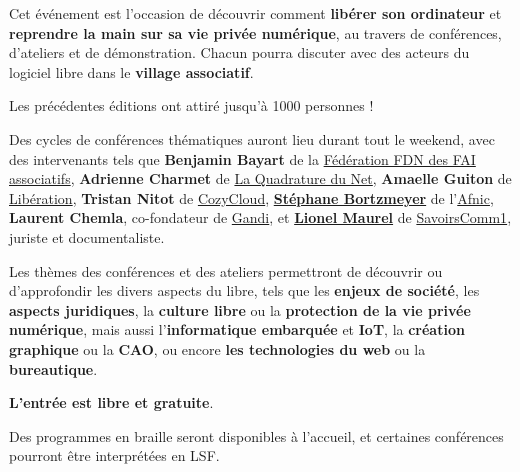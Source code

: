 
\Separateur

Cet événement est l'occasion de découvrir comment \textbf{libérer son ordinateur}
et \textbf{reprendre la main sur sa vie privée numérique},
au travers de conférences, d'ateliers et de démonstration.
Chacun pourra discuter avec des acteurs du logiciel libre dans le \textbf{village associatif}.

Les précédentes éditions ont attiré jusqu'à 1000 personnes !

\Separateur

Des cycles de conférences thématiques auront lieu durant tout le weekend,
avec des intervenants tels que \textbf{Benjamin Bayart} de la \href{http://ffdn.org/}{Fédération FDN des FAI associatifs},
\textbf{Adrienne Charmet} de \href{http://laquadrature.net/}{La Quadrature du Net},
\textbf{Amaelle Guiton} de \href{http://www.liberation.fr/auteur/15260-amaelle-guiton}{Libération},
\textbf{Tristan Nitot} de \href{https://cozy.io/fr/}{CozyCloud},
\textbf{\href{http://www.bortzmeyer.org/}{Stéphane Bortzmeyer}} de l'\href{}{Afnic},
\textbf{Laurent Chemla}, co-fondateur de \href{http://gandi.net/}{Gandi},
et \textbf{\href{http://scinfolex.com/}{Lionel Maurel}} de \href{http://savoirscom1.info/}{SavoirsComm1}, juriste et documentaliste.

\Separateur

Les thèmes des conférences et des ateliers permettront de découvrir ou d'approfondir
les divers aspects du libre, tels que les \textbf{enjeux de société}, les \textbf{aspects juridiques},
la \textbf{culture libre} ou la \textbf{protection de la vie privée numérique},
mais aussi l'\textbf{informatique embarquée} et \textbf{IoT}, la \textbf{création graphique} ou la \textbf{CAO},
ou encore \textbf{les technologies du web} ou la \textbf{bureautique}.

\Separateur

\textbf{L'entrée est libre et gratuite}.

\Separateur

Des programmes en braille seront disponibles à l'accueil, et certaines conférences pourront être interprétées en LSF.
